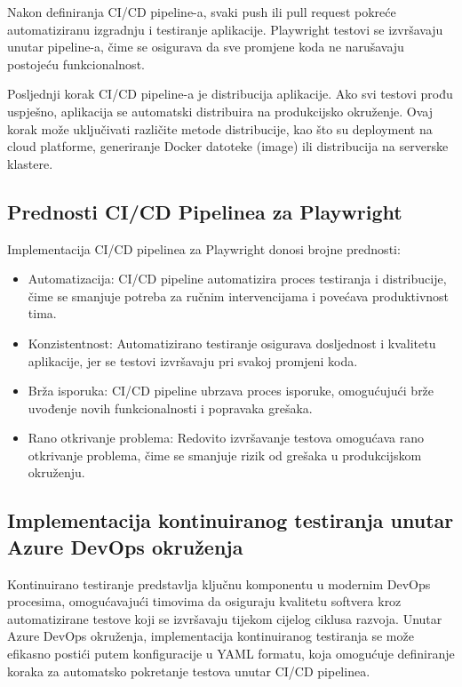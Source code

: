 Nakon definiranja CI/CD pipeline-a, svaki push ili pull request pokreće automatiziranu izgradnju i testiranje aplikacije. 
Playwright testovi se izvršavaju unutar pipeline-a, čime se osigurava da sve promjene koda ne narušavaju postojeću funkcionalnost.

Posljednji korak CI/CD pipeline-a je distribucija aplikacije. 
Ako svi testovi prođu uspješno, aplikacija se automatski distribuira na produkcijsko okruženje. 
Ovaj korak može uključivati različite metode distribucije, kao što su deployment na cloud platforme, generiranje Docker datoteke (image) ili distribucija na serverske klastere.

\subsection*{Prednosti CI/CD Pipelinea za Playwright}
Implementacija CI/CD pipelinea za Playwright donosi brojne prednosti:
\begin{itemize}
    \item Automatizacija: CI/CD pipeline automatizira proces testiranja i distribucije, čime se smanjuje potreba za ručnim intervencijama i povećava produktivnost tima.
    \item Konzistentnost: Automatizirano testiranje osigurava dosljednost i kvalitetu aplikacije, jer se testovi izvršavaju pri svakoj promjeni koda.
    \item Brža isporuka: CI/CD pipeline ubrzava proces isporuke, omogućujući brže uvođenje novih funkcionalnosti i popravaka grešaka.
    \item Rano otkrivanje problema: Redovito izvršavanje testova omogućava rano otkrivanje problema, čime se smanjuje rizik od grešaka u produkcijskom okruženju.
\end{itemize}

\subsection*{Implementacija kontinuiranog testiranja unutar Azure DevOps okruženja}

Kontinuirano testiranje predstavlja ključnu komponentu u modernim DevOps procesima, omogućavajući timovima da osiguraju kvalitetu softvera kroz automatizirane testove koji se izvršavaju tijekom cijelog ciklusa razvoja. Unutar Azure DevOps okruženja, implementacija kontinuiranog testiranja se može efikasno postići putem konfiguracije u YAML formatu, koja omogućuje definiranje koraka za automatsko pokretanje testova unutar CI/CD pipelinea.

